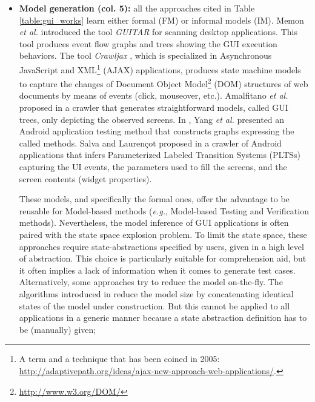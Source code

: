 \begin{itemize}
	\item \textbf{Model generation (col. 5):} all the approaches
	cited in Table \ref{table:gui_works} learn either formal
	(FM) or informal models (IM). Memon \emph{et al.} \cite{guitar}
	introduced the tool \textit{GUITAR} for scanning desktop
	applications. This tool produces event flow graphs and trees
	showing the GUI execution behaviors. The tool
	\textit{Crawljax} \cite{crawljax:tweb12}, which is
	specialized in Asynchronous JavaScript and XML\footnote{A term and a technique that has been coined in 2005: \url{http://adaptivepath.org/ideas/ajax-new-approach-web-applications/}.} (AJAX) applications, produces state machine
	models to capture the changes of Document Object Model\footnote{\url{http://www.w3.org/DOM/}} (DOM)
	structures of web documents by means of events (click,
	mouseover, etc.).
	Amalfitano \emph{et al.} proposed in
	\cite{Amalfitano:2012:UGR:2351676.2351717} a crawler that
	generates straightforward models, called GUI trees, only
	depicting the observed screens. In \cite{WPX13}, Yang \emph{et al.}
	presented an Android application testing method that
	constructs graphs expressing the called methods. Salva and
	Laurençot proposed in \cite{SP15} a crawler of Android
	applications that infers Parameterized Labeled Transition
    Systems (PLTSs) capturing the UI events, the parameters used
    to fill the screens, and the screen contents (widget
	properties).

    These models, and specifically the formal ones, offer the
    advantage to be reusable for Model-based methods
    (\emph{e.g.}, Model-based Testing and Verification methods).
    Nevertheless, the model inference of GUI applications is often
    paired with the state space explosion problem. To limit the
    state space, these approaches
    \cite{MobiGUITARIEEESoftware2014,guitar,5954416,WPX13,SP15}
    require state-abstractions specified by users, given in a
    high level of abstraction. This choice is particularly
    suitable for comprehension aid, but it often implies a lack
    of information when it comes to generate test cases.
    Alternatively, some approaches try to reduce the model
    on-the-fly. The algorithms introduced in
    \cite{crawljax:tweb12,4656395} reduce the model size by
    concatenating identical states of the model under
    construction.  But this cannot be applied to all
    applications in a generic manner because a state abstraction
    definition has to be (manually) given;


\end{itemize}
